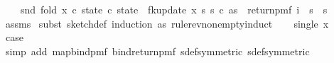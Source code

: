 \begin{isabellebody}
\ \ \ \ {\isacharparenleft}{\kern0pt}snd\ {\isacharparenleft}{\kern0pt}fold\ {\isacharparenleft}{\kern0pt}{\isasymlambda}x\ {\isacharparenleft}{\kern0pt}c{\isacharcomma}{\kern0pt}\ state{\isacharparenright}{\kern0pt}{\isachardot}{\kern0pt}\ {\isacharparenleft}{\kern0pt}c{\isacharplus}{\kern0pt}{}{\isacharcomma}{\kern0pt}\ state\ {\isasymbind}\ fk{\isacharunderscore}{\kern0pt}update{\isacharprime}{\kern0pt}\ x\ s\ s\ c{\isacharparenright}{\kern0pt}{\isacharparenright}{\kern0pt}\ as\ {\isacharparenleft}{\kern0pt}{}{\isacharcomma}{\kern0pt}\ return{\isacharunderscore}{\kern0pt}pmf\ {\isacharparenleft}{\kern0pt}{\isasymlambda}i\ {\isasymin}\ {\isacharbraceleft}{\kern0pt}{}{\isachardot}{\kern0pt}{\isachardot}{\kern0pt}{\isacharless}{\kern0pt}s\ {\isasymtimes}\ {\isacharbraceleft}{\kern0pt}{}{\isachardot}{\kern0pt}{\isachardot}{\kern0pt}{\isacharless}{\kern0pt}s\ {\isacharparenleft}{\kern0pt}{}{\isacharcomma}{\kern0pt}{}{\isacharparenright}{\kern0pt}{\isacharparenright}{\kern0pt}{\isacharparenright}{\kern0pt}{\isacharparenright}{\kern0pt}{\isacharparenright}{\kern0pt}{\isachardoublequoteclose}\isanewline
%
\isadelimproof
\ \ %
\endisadelimproof
%
\isatagproof
{}\isamarkupfalse%
\ assms{\isacharparenleft}{\kern0pt}{}{\isacharparenright}{\kern0pt}\isanewline
{}\isamarkupfalse%
\ {\isacharparenleft}{\kern0pt}subst\ sketch{\isacharunderscore}{\kern0pt}def{\isacharcomma}{\kern0pt}\ induction\ as\ rule{\isacharcolon}{\kern0pt}rev{\isacharunderscore}{\kern0pt}nonempty{\isacharunderscore}{\kern0pt}induct{\isacharparenright}{\kern0pt}\isanewline
\ \ \isamarkupfalse%
\ {\isacharparenleft}{\kern0pt}single\ x{\isacharparenright}{\kern0pt}\isanewline
\ \ \isamarkupfalse%
\ \isamarkupfalse%
\ {\isacharquery}{\kern0pt}case\ \isanewline
\ \ \ \ \isamarkupfalse%
\ {\isacharparenleft}{\kern0pt}simp\ add{\isacharcolon}{\kern0pt}\ map{\isacharunderscore}{\kern0pt}bind{\isacharunderscore}{\kern0pt}pmf\ bind{\isacharunderscore}{\kern0pt}return{\isacharunderscore}{\kern0pt}pmf\ sdef{\isacharbrackleft}{\kern0pt}symmetric{\isacharbrackright}{\kern0pt}\ sdef{\isacharbrackleft}{\kern0pt}symmetric{\isacharbrackright}{\kern0pt}{\isacharparenright}{\kern0pt}\isanewline

\end{isabellebody}
